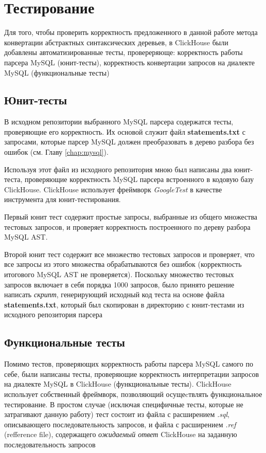 \section{Тестирование} \label{chap:testing}
Для того, чтобы проверить корректность предложенного в данной работе метода конвертации абстрактных синтаксических деревьев, в ClickHouse были добавлены автоматизированные тесты, провереряюще: корректность работы парсера MySQL (юнит-тесты), корректность конвертации запросов на диалекте MySQL (функциональные тесты)

\subsection{Юнит-тесты}
В исходном репозитории выбранного MySQL парсера содержатся тесты, проверяющие его корректность. Их основой служит файл \textbf{statements.txt} с запросами, которые парсер MySQL должен преобразовать в дерево разбора без ошибок (см. Главу \ref{chap:mysql}).

Используя этот файл из исходного репозитория мною был написаны два юнит-теста, проверяющие корректность MySQL парсера встроенного в кодовую базу ClickHouse. ClickHouse использует фреймворк \textit{GoogleTest} в качестве инструмента для юнит-тестирования.

Первый юнит тест содержит простые запросы, выбранные из общего множества тестовых запросов, и проверяет корректность построенного по дереву разбора MySQL AST.

Второй юнит тест содержит все множество тестовых запросов и проверяет, что все запросы из этого множества обрабатываются без ошибок (корректность итогового MySQL AST не проверяется). Поскольку множество тестовых запросов включает в себя порядка 1000 запросов, было принято решение написать \textit{скрипт}, генерирующий исходный код теста на основе файла \textbf{statements.txt}, который был скопирован в директорию с юнит-тестами из исходного репозитория парсера

\subsection{Функциональные тесты}
Помимо тестов, проверяющих корректность работы парсера MySQL самого по себе, были написаны тесты, проверяющие корректность интерпретации запросов на диалекте MySQL в ClickHouse (функциональные тесты). ClickHouse использует собственный фреймворк, позволяющий осущеcтвлять функциональное тестирование. В простом случае (исключая специфичные тесты, которые не затрагивают данную работу) тест состоит из файла с расширением \textit{.sql}, описывающего последовательность запросов, и файла с расширением \textit{.ref} (refference file), содержащего \textit{ожидаемый ответ} ClickHouse на заданную последовательность запросов

